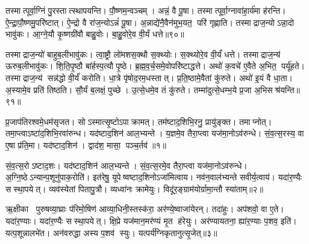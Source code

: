 तस्मात्पूर्वा॒ग्निं पु॒रस्तात्स्थापयन्ति। पौ॒ष्णम॒न्वञ्चम्। अन्नं॒ वै पू॒षा। तस्मात्पूर्वा॒ग्नावा॑हा॒र्य॑मा ह॑रन्ति। ऐ॒न्द्रा॒पौ॒ष्णमु॒परि॑ष्टात्। ऐ॒न्द्रो वै रा॑ज॒न्योऽन्नं॑ पू॒षा। अ॒न्नाद्ये॑नै॒वैन॑मुभ॒यत॒ परि॑ गृह्णाति। तस्माद्राज॒न्योऽन्ना॒दो भावु॑कः। आ॒ग्ने॒यौ कृ॒ष्णग्री॑वौ बाहु॒वोः। बा॒हु॒वोरे॒व वी॒र्यं धत्ते॥९०॥

तस्माद्राज॒न्यो॑ बाहुब॒लीभावु॑कः। त्वा॒ष्ट्रौ लो॑मशस॒क्थौ स॒क्थ्योः। स॒क्थ्योरे॒व वी॒र्यं॑ धत्ते। तस्माद्राज॒न्य॑ ऊरुब॒लीभावु॑कः। शि॒ति॒पृ॒ष्ठौ बा॑र्\mbox{}हस्प॒त्यौ पृ॒ष्ठे। ब्र॒ह्म॒व॒र्च॒समे॒वोपरि॑ष्टाद्धत्ते। अथो॑ क॒वचे॑ ए॒वैते अ॒भित॒ पर्यू॑हते। तस्माद्राज॒न्य॑ सन्न॑द्धो वी॒र्यं॑ करोति। धा॒त्रे पृ॑षोद॒रम॒धस्तात्। प्र॒ति॒ष्ठामे॒वैतां कु॑रुते। अथो॑ इ॒यं वै धा॒ता। अ॒स्यामे॒व प्रति॑ तिष्ठति। सौ॒र्यं ब॒लक्षं॒ पुच्छे। उ॒त्से॒धमे॒व तं कु॑रुते। तम्मा॑दुत्से॒धम्भ॒ये प्र॒जा अ॒भिसश्र॑यन्ति॥९१॥



\clearpage
{}
\setcounter{anuvakam}{0}
प्र॒जाप॑तिरश्वमे॒धम॑सृजत। सोऽस्मात्सृ॒ष्टोऽपाक्रामत्। तम॑ष्टाद॒शिभि॒रनु॒ प्रायु॑ङ्क्त। तमाप्नोत्। तमा॒प्त्वाऽष्टा॑द॒शिभि॒रवा॑रुन्ध। यद॑ष्टाद॒शिन॑ आल॒भ्यन्ते। य॒ज्ञमे॒व तैरा॒प्त्वा यज॑मा॒नोऽव॑रुन्धे। सं॒व॒त्स॒रस्य॒ वा ए॒षा प्र॑ति॒मा। यद॑ष्टाद॒शिन॑। द्वाद॑श॒ मासा॒ पञ्च॒र्तव॑॥१॥

सं॒व॒त्स॒रोऽष्टाद॒शः। यद॑ष्टाद॒शिन॑ आल॒भ्यन्ते। सं॒व॒त्स॒रमे॒व तैरा॒प्त्वा यज॑मा॒नोऽव॑रुन्धे। अ॒ग्नि॒ष्ठेऽन्यान्प॒शूनु॑पाक॒रोति॑। इत॑रेषु॒ यूपेष्वष्टाद॒शिनोऽजा॑मित्वाय। नव॑न॒वाल॑भ्यन्ते सवीर्य॒त्वाय॑। यदा॑र॒ण्यैः सस्था॒पयेत्। व्यव॑स्येतां पितापु॒त्रौ। व्यध्वा॑नः क्रामेयुः। विदू॑र॒ङ्ग्राम॑योर्ग्रामा॒न्तौ स्या॑ताम्॥२॥

ऋ॒क्षीका पुरुषव्या॒घ्राः प॑रिमो॒षिण॑ आव्या॒धिनी॒स्तस्क॑रा॒ अर॑ण्ये॒ष्वाजा॑येरन्। तदा॑हुः। अप॑शवो॒ वा ए॒ते। यदा॑र॒ण्याः। यदा॑र॒ण्यैः सस्था॒पयेत्। क्षि॒प्रे यज॑मान॒मर॑ण्यं मृ॒त ह॑रेयुः। अर॑ण्यायतना॒ ह्या॑र॒ण्याः प॒शव॒ इति॑। यत्प॒शून्नालभे॑त। अन॑वरुद्धा अस्य प॒शव॑ स्युः। यत्पर्य॑ग्निकृतानुत्सृ॒जेत्॥३॥

